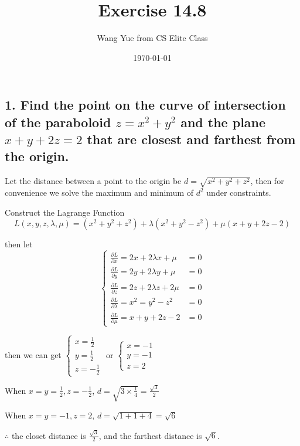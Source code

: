 \documentclass{article}
\begin{document}
  \title{Exercise 14.8}
  \author{Wang Yue from CS Elite Class}
  \date{\today}
  \maketitle

  \subsection*{1. Find the point on the curve of intersection of the paraboloid $z = x^2+y^2$ and the plane $x+y+2z=2$ that are closest and farthest from the origin.}

  Let the distance between a point to the origin be $d = \sqrt{x^2+y^2+z^2}$, then for convenience we solve the maximum and minimum of $d^2$ under constraints.

  Construct the Lagrange Function $$L(x, y, z, \lambda, \mu) = (x^2+y^2+z^2) + \lambda (x^2+y^2-z^2) + \mu(x+y+2z-2)$$
  
  then let $$\left\{ \begin{array}{ll} 
    \frac{\partial L}{\partial x} = 2x + 2 \lambda x + \mu &= 0 \\
    \frac{\partial L}{\partial y} = 2y + 2 \lambda y + \mu &= 0 \\
    \frac{\partial L}{\partial z} = 2z + 2 \lambda z + 2 \mu &= 0 \\
    \frac{\partial L}{\partial \lambda} = x^2 = y^2 - z^2 &= 0 \\
    \frac{\partial L}{\partial \mu} = x + y + 2z - 2 &= 0
  \end{array}\right.$$

  then we can get $\left\{ \begin{array}{ll} x = \frac 1 2 \\ y = \frac 1 2 \\ z = -\frac 1 2 \end{array}\right.$ or $\left\{ \begin{array}{ll} x = -1 \\ y = -1 \\ z = 2 \end{array}\right.$

  When $x = y = \frac 1 2, z = -\frac 1 2$, $d = \sqrt{3 \times \frac 1 4} = \frac{\sqrt 3}{2}$

  When $x = y = -1, z = 2$, $d = \sqrt{1 + 1 + 4} = \sqrt 6$

  $\therefore$ the closet distance is $\frac{\sqrt 3}{2}$, and the farthest distance is $\sqrt 6$.
\end{document}
